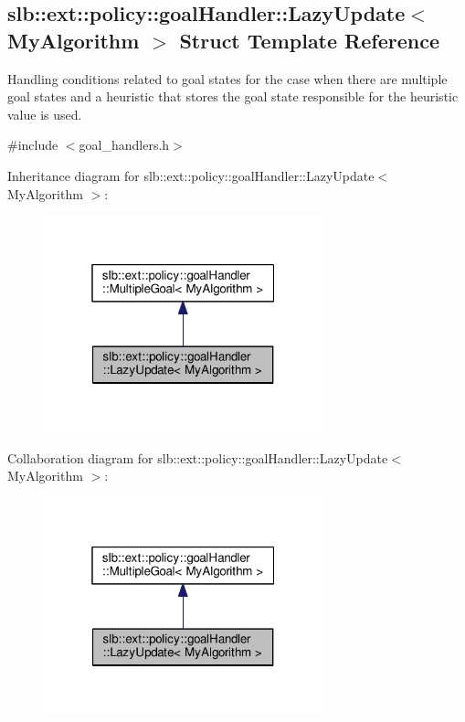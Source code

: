 \hypertarget{structslb_1_1ext_1_1policy_1_1goalHandler_1_1LazyUpdate}{}\subsection{slb\+:\+:ext\+:\+:policy\+:\+:goal\+Handler\+:\+:Lazy\+Update$<$ My\+Algorithm $>$ Struct Template Reference}
\label{structslb_1_1ext_1_1policy_1_1goalHandler_1_1LazyUpdate}


Handling conditions related to goal states for the case when there are multiple goal states and a heuristic that stores the goal state responsible for the heuristic value is used.  




{\ttfamily \#include $<$goal\+\_\+handlers.\+h$>$}



Inheritance diagram for slb\+:\+:ext\+:\+:policy\+:\+:goal\+Handler\+:\+:Lazy\+Update$<$ My\+Algorithm $>$\+:\nopagebreak
\begin{figure}[H]
\begin{center}
\leavevmode
\includegraphics[width=229pt]{structslb_1_1ext_1_1policy_1_1goalHandler_1_1LazyUpdate__inherit__graph}
\end{center}
\end{figure}


Collaboration diagram for slb\+:\+:ext\+:\+:policy\+:\+:goal\+Handler\+:\+:Lazy\+Update$<$ My\+Algorithm $>$\+:\nopagebreak
\begin{figure}[H]
\begin{center}
\leavevmode
\includegraphics[width=229pt]{structslb_1_1ext_1_1policy_1_1goalHandler_1_1LazyUpdate__coll__graph}
\end{center}
\end{figure}
